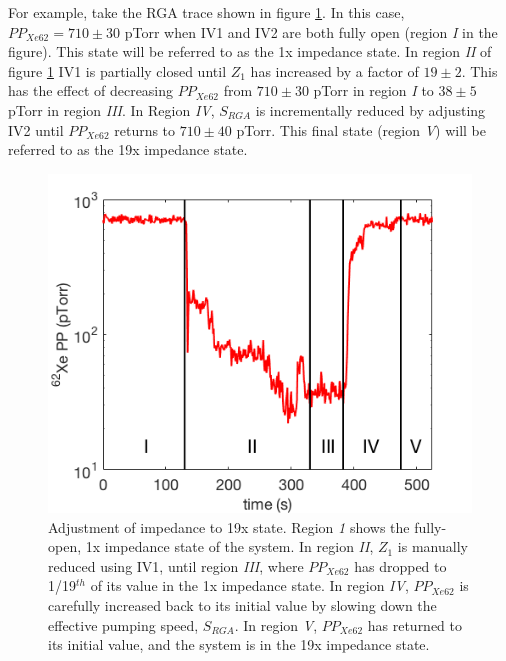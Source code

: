 \documentclass[12pt]{article}
\begin{document}
For example, take the RGA trace shown in figure \ref{fig:imp_adj}. In this case, $PP_{Xe62}= 710 \pm30$ pTorr when IV1 and IV2 are both fully open (region \emph{I} in the figure). This state will be referred to as the 1x impedance state. In region \emph{II} of figure \ref{fig:imp_adj} IV1 is partially closed until $Z_1$ has increased by a factor of $19\pm2$. This has the effect of decreasing $PP_{Xe62}$ from $710\pm30$ pTorr in region \emph{I} to $38\pm5$ pTorr in region \emph{III}. In Region \emph{IV}, $S_{RGA}$ is incrementally reduced by adjusting IV2 until $PP_{Xe62}$ returns to $710\pm40$ pTorr. This final state (region \emph{V}) will be referred to as the 19x impedance state.

\begin{figure}[h!]
\centering
\includegraphics[width=\textwidth]{Figures/impedance_adjust.png}
\caption{Adjustment of impedance to 19x state. Region \emph{1} shows the fully-open, 1x impedance state of the system. In region \emph{II}, $Z_1$ is manually reduced using IV1, until region \emph{III}, where $PP_{Xe62}$ has dropped to 1/19$^{th}$ of its value in the 1x impedance state. In region \emph{IV}, $PP_{Xe62}$ is carefully increased back to its initial value by slowing down the effective pumping speed, $S_{RGA}$. In region \emph{V}, $PP_{Xe62}$ has returned to its initial value, and the system is in the 19x impedance state. }
\label{fig:imp_adj}
\end{figure}
\end{document}
